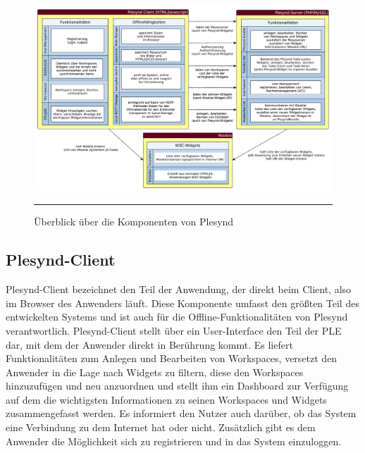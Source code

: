 \begin{landscape}
\begin{figure}
  \centering
  \includegraphics[height=\textheight,keepaspectratio]{./Figures/konzeptionelle_loesung_table.pdf}
    \rule{35em}{0.5pt}
  \caption[Überblick über die Komponenten von Plesynd]{Überblick über die Komponenten von Plesynd}
  \label{fig:ueberblick_plesynd_komponenten}
\end{figure}
\end{landscape}

\subsection{Plesynd-Client}
Plesynd-Client bezeichnet den Teil der Anwendung, der direkt beim Client, also im Browser des Anwenders läuft. Diese Komponente umfasst den größten Teil des entwickelten Systems und ist auch für die Offline-Funktionalitäten von Plesynd verantwortlich. Plesynd-Client stellt über ein User-Interface den Teil der PLE dar, mit dem der Anwender direkt in Berührung kommt. Es liefert Funktionalitäten zum Anlegen und Bearbeiten von Workspaces, versetzt den Anwender in die Lage nach Widgets zu filtern, diese den Workspaces hinzuzufügen und neu anzuordnen und stellt ihm ein Dashboard zur Verfügung auf dem die wichtigsten Informationen zu seinen Workspaces und Widgets zusammengefasst werden. Es informiert den Nutzer auch darüber, ob das System eine Verbindung zu dem Internet hat oder nicht. Zusätzlich gibt es dem Anwender die Möglichkeit sich zu registrieren und in das System einzuloggen. 

